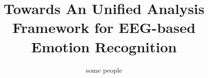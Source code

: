 \documentclass{sig-alternate}
\begin{document}
%

\title{Towards An Unified Analysis Framework for EEG-based Emotion Recognition}

%
\author{
%
%
\alignauthor
some people
}



\maketitle
\begin{abstract}
\vspace{6cm}
\end{abstract}


\end{document}
